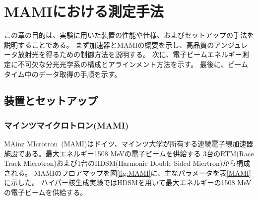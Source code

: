\documentclass[a4paper,11pt,uplatex]{jsbook}
\begin{document}
\chapter{MAMIにおける測定手法}
この章の目的は、実験に用いた装置の性能や仕様、およびセットアップの手法を説明することである。
まず加速器とMAMIの概要を示し、高品質のアンジュレータ放射光を得るための制御方法を説明する。
次に、電子ビームエネルギー測定に不可欠な分光光学系の構成とアラインメント方法を示す。
最後に、ビームタイム中のデータ取得の手順を示す。
\section{装置とセットアップ}
\subsection{マインツマイクロトロン(MAMI)}
MAinz MIcrotron~(MAMI)はドイツ、マインツ大学が所有する連続電子線加速器施設である。最大エネルギー1508 MeVの電子ビームを供給する
3台のRTM(Race Track Microtron)および1台のHDSM(Harmonic Double Sided Micrtron)から構成される。
MAMIのフロアマップを図\ref{fig:MAMI}に、主なパラメータを表\ref{MAMI}に示した。
ハイパー核生成実験ではHDSMを用いて最大エネルギーの1508 MeVの電子ビームを供給する。
\end{document}
